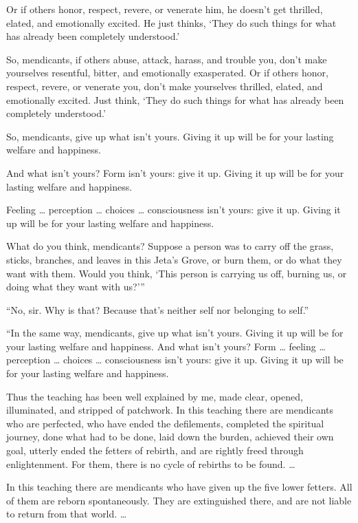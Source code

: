 \documentclass[12pt,openany]{book}%
\begin{document}
Or if others honor, respect, revere, or venerate him, he doesn’t get thrilled, elated, and emotionally excited. He just thinks, ‘They do such things for what has already been completely understood.’ 

So, mendicants, if others abuse, attack, harass, and trouble you, don’t make yourselves resentful, bitter, and emotionally exasperated. Or if others honor, respect, revere, or venerate you, don’t make yourselves thrilled, elated, and emotionally excited. Just think, ‘They do such things for what has already been completely understood.’ 

So, mendicants, give up what isn't yours. Giving it up will be for your lasting welfare and happiness. 

And what isn’t yours? Form isn’t yours: give it up. Giving it up will be for your lasting welfare and happiness. 

Feeling … perception … choices … consciousness isn’t yours: give it up. Giving it up will be for your lasting welfare and happiness. 

What do you think, mendicants? Suppose a person was to carry off the grass, sticks, branches, and leaves in this Jeta’s Grove, or burn them, or do what they want with them. Would you think, ‘This person is carrying us off, burning us, or doing what they want with us?’” 

“No, sir. Why is that? Because that’s neither self nor belonging to self.” 

“In the same way, mendicants, give up what isn't yours. Giving it up will be for your lasting welfare and happiness. And what isn’t yours? Form … feeling … perception … choices … consciousness isn’t yours: give it up. Giving it up will be for your lasting welfare and happiness. 

Thus the teaching has been well explained by me, made clear, opened, illuminated, and stripped of patchwork. In this teaching there are mendicants who are perfected, who have ended the defilements, completed the spiritual journey, done what had to be done, laid down the burden, achieved their own goal, utterly ended the fetters of rebirth, and are rightly freed through enlightenment. For them, there is no cycle of rebirths to be found. … 

In this teaching there are mendicants who have given up the five lower fetters. All of them are reborn spontaneously. They are extinguished there, and are not liable to return from that world. … 
\end{document}
